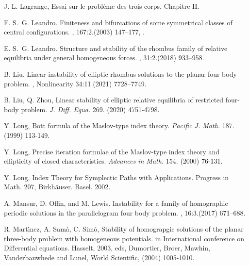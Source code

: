 \documentclass[11pt]{article}
\begin{document}
\begin{thebibliography}{}
  J. L. Lagrange,  Essai sur le probl\`{e}me des trois corps. Chapitre II.

E. S.~G. Leandro.
\newblock Finiteness and bifurcations of some symmetrical classes of central
configurations.
, 167:2.(2003) 147--177,
.

E. S.~G. Leandro.
\newblock Structure and stability of the rhombus family of relative equilibria
under general homogeneous forces.
, 31:2.(2018) 933--958.



B. Liu.
\newblock Linear instability of elliptic rhombus solutions to the planar four-body problem.
, Nonlinearity 34:11.(2021) 7728–7749.


 B. Liu, Q. Zhou, Linear stability of elliptic relative equilibria of restricted four-body problem.
{\it J. Diff. Equa.} 269. (2020) 4751-4798.

 Y. Long, Bott formula of the Maslov-type index
theory. {\it Pacific J. Math.} 187. (1999) 113-149.

 Y. Long, Precise iteration formulae of the Maslov-type
index theory and ellipticity of closed characteristics. {\it Advances
in Math.} 154. (2000) 76-131.

 Y. Long, Index Theory for Symplectic Paths with
	Applications. Progress in Math. 207, Birkh\"auser. Basel. 2002.


A. Mansur, D. Offin, and M. Lewis.
\newblock Instability for a family of homographic periodic solutions in the
parallelogram four body problem.
, 16:3.(2017) 671--688.

 R. Mart\'{\i}nez, A. Sam\`{a}, C. Sim\'{o},
Stability of homograpgic solutions of the planar three-body problem
with homogeneous potentials. in International conference on
Differential equations. Hasselt, 2003, eds, Dumortier, Broer, Mawhin,
Vanderbauwhede and Lunel, World Scientific, (2004) 1005-1010.


\end{thebibliography}
\end{document}
